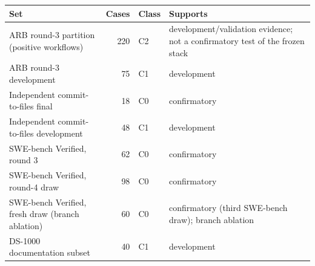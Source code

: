 \begin{tabular}{lrlp{5.4cm}}
\toprule
Set & Cases & Class & Supports \\
\midrule
ARB round-3 partition (positive workflows) & 220 & C2 & development/validation evidence; not a confirmatory test of the frozen stack \\
ARB round-3 development & 75 & C1 & development \\
Independent commit-to-files final & 18 & C0 & confirmatory \\
Independent commit-to-files development & 48 & C1 & development \\
SWE-bench Verified, round 3 & 62 & C0 & confirmatory \\
SWE-bench Verified, round-4 draw & 98 & C0 & confirmatory \\
SWE-bench Verified, fresh draw (branch ablation) & 60 & C0 & confirmatory (third SWE-bench draw); branch ablation \\
DS-1000 documentation subset & 40 & C1 & development \\
\bottomrule
\end{tabular}%